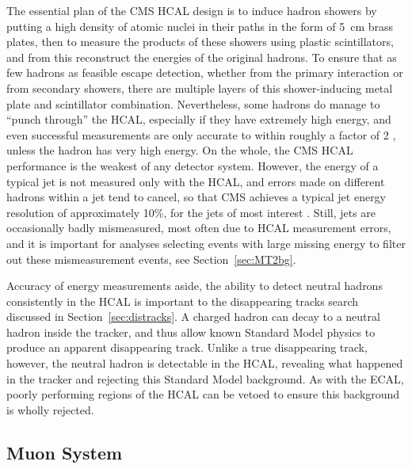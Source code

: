   The essential plan of the CMS HCAL design is to induce hadron showers by putting a high density of atomic nuclei in their paths in the form of 5~cm brass plates, then to measure the products of these showers using plastic scintillators, and from this reconstruct the energies of the original hadrons.
  To ensure that as few hadrons as feasible escape detection, whether from the primary interaction or from secondary showers, there are multiple layers of this shower-inducing metal plate and scintillator combination.
  Nevertheless, some hadrons do manage to ``punch through'' the HCAL, especially if they have extremely high energy, and even successful measurements are only accurate to within roughly a factor of 2 \cite{HCALphase1}, unless the hadron has very high energy.
  On the whole, the CMS HCAL performance is the weakest of any detector system.
  However, the energy of a typical jet is not measured only with the HCAL, and errors made on different hadrons within a jet tend to cancel, so that CMS achieves a typical jet energy resolution of approximately 10\%, for the jets of most interest \cite{cms_tdr}.
  Still, jets are occasionally badly mismeasured, most often due to HCAL measurement errors, and it is important for analyses selecting events with large missing energy to filter out these mismeasurement events, see Section~\ref{sec:MT2bg}.

  Accuracy of energy measurements aside, the ability to detect neutral hadrons consistently in the HCAL is important to the disappearing tracks search discussed in Section~\ref{sec:distracks}.
  A charged hadron can decay to a neutral hadron inside the tracker, and thus allow known Standard Model physics to produce an apparent disappearing track.
  Unlike a true disappearing track, however, the neutral hadron is detectable in the HCAL, revealing what happened in the tracker and rejecting this Standard Model background.
  As with the ECAL, poorly performing regions of the HCAL can be vetoed to ensure this background is wholly rejected.

  \subsection{Muon System} \label{sec:muon}

